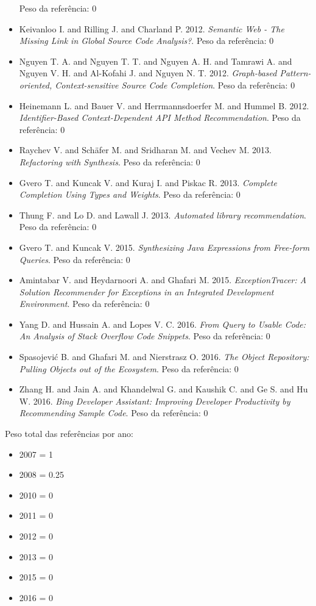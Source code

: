 \begin{itemize}
      Peso da referência: 0
\item Keivanloo I. and Rilling J. and Charland P.
      2012.
      {\it Semantic Web - The Missing Link in Global Source Code Analysis?}.
      Peso da referência: 0
\item Nguyen T. A. and Nguyen T. T. and Nguyen A. H. and Tamrawi A. and Nguyen V. H. and Al-Kofahi J. and Nguyen N. T.
      2012.
      {\it Graph-based Pattern-oriented, Context-sensitive Source Code Completion}.
      Peso da referência: 0
\item Heinemann L. and Bauer V. and Herrmannsdoerfer M. and Hummel B.
      2012.
      {\it Identifier-Based Context-Dependent API Method Recommendation}.
      Peso da referência: 0
\item Raychev V. and Sch\"{a}fer M. and Sridharan M. and Vechev M.
      2013.
      {\it Refactoring with Synthesis}.
      Peso da referência: 0
\item Gvero T. and Kuncak V. and Kuraj I. and Piskac R.
      2013.
      {\it Complete Completion Using Types and Weights}.
      Peso da referência: 0
\item Thung F. and Lo D. and Lawall J.
      2013.
      {\it Automated library recommendation}.
      Peso da referência: 0
\item Gvero T. and Kuncak V.
      2015.
      {\it Synthesizing Java Expressions from Free-form Queries}.
      Peso da referência: 0
\item Amintabar V. and Heydarnoori A. and Ghafari M.
      2015.
      {\it ExceptionTracer: A Solution Recommender for Exceptions in an Integrated Development Environment}.
      Peso da referência: 0
\item Yang D. and Hussain A. and Lopes V. C.
      2016.
      {\it From Query to Usable Code: An Analysis of Stack Overflow Code Snippets}.
      Peso da referência: 0
\item Spasojevi\'{c} B. and Ghafari M. and Nierstrasz O.
      2016.
      {\it The Object Repository: Pulling Objects out of the Ecosystem}.
      Peso da referência: 0
\item Zhang H. and Jain A. and Khandelwal G. and Kaushik C. and Ge S. and Hu W.
      2016.
      {\it Bing Developer Assistant: Improving Developer Productivity by Recommending Sample Code}.
      Peso da referência: 0
\end{itemize}

Peso total das referências por ano:

\begin{itemize}
\item 2007 = 1
\item 2008 = 0.25
\item 2010 = 0
\item 2011 = 0
\item 2012 = 0
\item 2013 = 0
\item 2015 = 0
\item 2016 = 0
\end{itemize}


